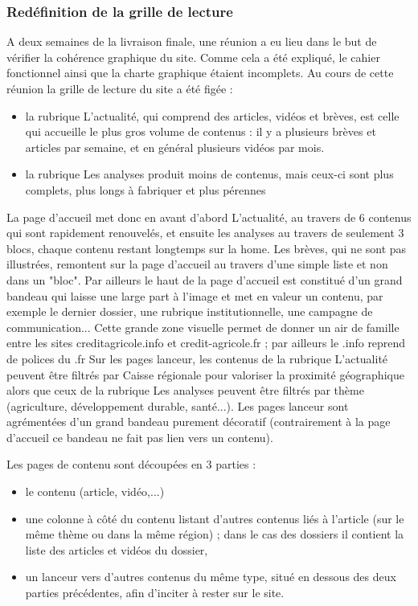 \documentclass[12pt,a4paper]{article}
\begin{document}
\subsubsection{Redéfinition de la grille de lecture}
A deux semaines de la livraison finale, une réunion a eu lieu dans le but de vérifier la cohérence graphique du site. Comme cela a été expliqué, le cahier fonctionnel ainsi que la charte graphique étaient incomplets. 
Au cours de cette réunion la grille de lecture du site a été figée :
\begin{itemize}
\item la rubrique L'actualité, qui comprend des articles, vidéos et brèves, est celle qui accueille le plus gros volume de contenus : il y a plusieurs brèves et articles par semaine, et en général plusieurs vidéos par mois. 
\item la rubrique Les analyses produit moins de contenus, mais ceux-ci sont plus complets, plus longs à fabriquer et plus pérennes
\end{itemize}
La page d'accueil met donc en avant d'abord L'actualité, au travers de 6 contenus qui sont rapidement renouvelés, et ensuite les analyses au travers de seulement 3 blocs, chaque contenu restant longtemps sur la home. Les brèves, qui ne sont pas illustrées, remontent sur la page d'accueil au travers d'une simple liste et non dans un "bloc". 
Par ailleurs le haut de la page d'accueil est constitué d'un grand bandeau qui laisse une large part à l'image et met en valeur un contenu, par exemple le dernier dossier, une rubrique institutionnelle, une campagne de communication...  Cette grande zone visuelle permet de donner un air de famille entre les sites creditagricole.info et credit-agricole.fr ; par ailleurs le .info reprend de polices du .fr
Sur les pages lanceur, les contenus de la rubrique L'actualité peuvent être filtrés par Caisse régionale pour valoriser la proximité géographique alors que ceux de la rubrique Les analyses peuvent être filtrés par thème (agriculture, développement durable, santé...). Les pages lanceur sont agrémentées d'un grand bandeau purement décoratif (contrairement à la page d'accueil ce bandeau ne fait pas lien vers un contenu).  \par
Les pages de contenu sont découpées en 3 parties :
\begin{itemize}
\item le contenu (article, vidéo,...)
\item une colonne à côté du contenu listant d'autres contenus liés à l'article (sur le même thème ou dans la même région) ; dans le cas des dossiers il contient la liste des articles et vidéos du dossier,
\item un lanceur vers d'autres contenus du même type, situé en dessous des deux parties précédentes, afin d'inciter à rester sur le site.
\end{itemize}
\end{document}
